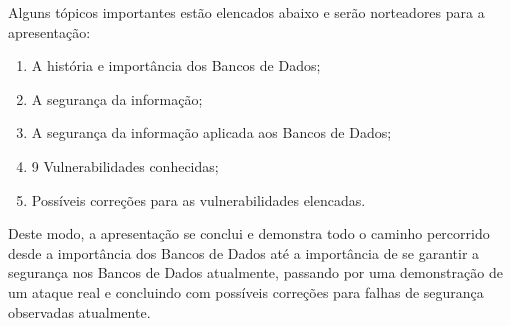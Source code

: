 Alguns tópicos importantes estão elencados abaixo e serão norteadores para a apresentação:
\begin{enumerate}
    \item A história e importância dos Bancos de Dados;
    \item A segurança da informação;
    \item A segurança da informação aplicada aos Bancos de Dados;
    \item 9 Vulnerabilidades conhecidas;
    \item Possíveis correções para as vulnerabilidades elencadas.
\end{enumerate}

Deste modo, a apresentação se conclui e demonstra todo o caminho percorrido desde a importância dos Bancos de Dados até a importância de se garantir a segurança nos Bancos de Dados atualmente, passando por uma demonstração de um ataque real e concluindo com possíveis correções para falhas de segurança observadas atualmente.

\nocite{*}
\printbibliography


